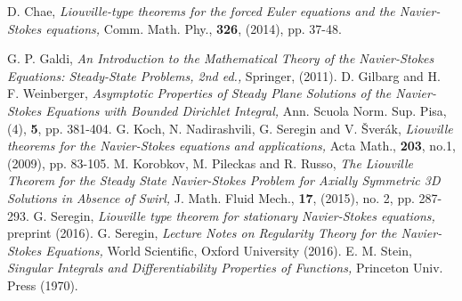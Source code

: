 \documentclass[12pt]{article}
\numberwithin{equation}{section}
\theoremstyle{definition}
\begin{document}
\begin{thebibliography}{1}
D. Chae, {\it Liouville-type theorems for the forced Euler equations and the Navier-Stokes equations,} Comm. Math. Phy., {\bf 326}, (2014),
 pp. 37-48.
 
 G. P. Galdi, {\it An Introduction to the Mathematical Theory of the Navier-Stokes Equations: Steady-State Problems, 2nd ed.,} Springer, (2011).
D. Gilbarg and H. F. Weinberger, {\it Asymptotic Properties of Steady Plane Solutions of the Navier-Stokes Equations with Bounded Dirichlet Integral, } Ann. Scuola Norm. Sup. Pisa, (4), {\bf 5}, pp. 381-404.
 G. Koch, N. Nadirashvili, G. Seregin and V. \v{S}ver\'{a}k, {\it Liouville theorems for the Navier-Stokes equations and applications,} Acta Math., {\bf203}, no.1, (2009), pp. 83-105.
M. Korobkov, M. Pileckas and R. Russo, {\it The Liouville Theorem for the Steady State Navier-Stokes Problem for Axially Symmetric 3D Solutions in Absence of Swirl, } J. Math. Fluid Mech., {\bf 17}, 
 (2015), no. 2, pp. 287-293.
 G. Seregin, {\it Liouville type theorem for stationary Navier-Stokes equations,}  preprint (2016).
 G. Seregin, {\it Lecture Notes on Regularity Theory for the Navier-Stokes Equations,}  World Scientific, Oxford University  (2016).
   E. M. Stein, {\it Singular Integrals and Differentiability Properties of Functions,} Princeton Univ. Press (1970).
 \end{thebibliography}
\end{document}
